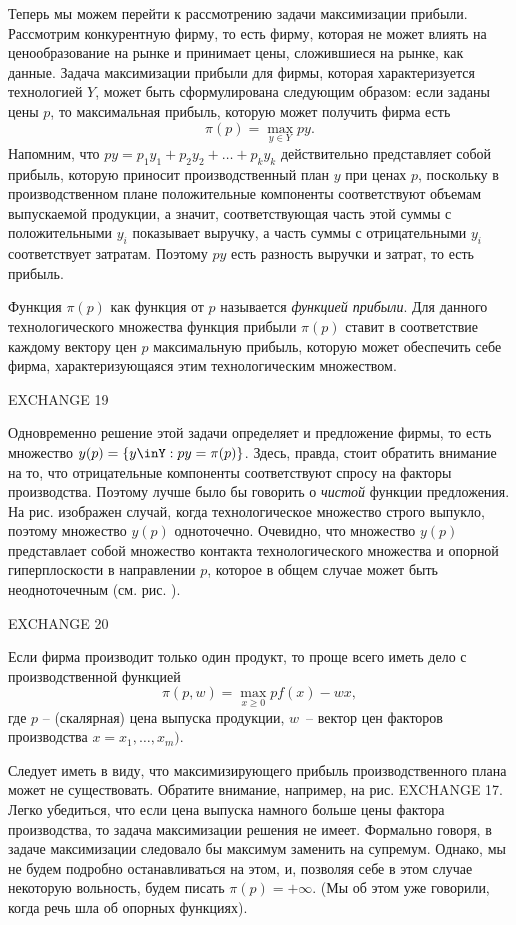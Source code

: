 Теперь мы можем перейти к рассмотрению задачи максимизации прибыли.
Рассмотрим конкурентную фирму, то есть
фирму, которая не может влиять на ценообразование на рынке и принимает
цены, сложившиеся на рынке, как данные. Задача максимизации прибыли
для фирмы, которая характеризуется технологией $Y$,
может быть сформулирована следующим образом: если заданы цены $p$, то
максимальная прибыль, которую может получить фирма есть
$$
\pi (p)=\max_{y\in Y} py.
$$
Напомним, что $py=p_1y_1+p_2y_2+\ldots+p_ky_k$ действительно представляет собой
прибыль, которую приносит производственный план $y$ при ценах
$p$, поскольку в производственном плане положительные компоненты соответствуют
объемам выпускаемой продукции, а значит, соответствующая часть этой суммы
с положительными $y_i$ показывает выручку, а часть суммы с отрицательными
$y_i$  соответствует затратам. Поэтому $py$ есть разность выручки и затрат,
то есть прибыль.

Функция $\pi (p)$ как функция от $p$ называется \emph{функцией прибыли}.
Для данного технологического множества функция прибыли $\pi (p)$ ставит
в соответствие каждому вектору цен $p$ максимальную прибыль, которую
может обеспечить себе фирма, характеризующаяся этим технологическим множеством.

EXCHANGE 19

Одновременно решение этой задачи определяет и предложение фирмы, то есть
множество $y(p)= \{y\inY: py=\pi(p)\}$. Здесь, правда, стоит обратить внимание на то,
что отрицательные компоненты соответствуют спросу на факторы производства. Поэтому
лучше было бы говорить о \emph{чистой} функции предложения.
На рис. изображен случай, когда технологическое множество строго выпукло,
поэтому множество $y(p)$ одноточечно. Очевидно, что множество $y(p)$
представлает собой множество контакта технологического множества и
опорной гиперплоскости в направлении $p$, которое в общем случае
может быть неодноточечным (см. рис.    ).

EXCHANGE 20

Если фирма производит только один продукт, то проще всего иметь дело с
производственной функцией
$$
\pi (p,w)=\max_{x\ge 0}pf(x)-wx,
$$
где $p$ -- (скалярная) цена выпуска продукции, $w$~-- вектор цен
факторов производства  $x=x_1,\ldots,x_m)$.


Следует иметь в виду, что максимизирующего прибыль производственного плана
может не существовать. Обратите внимание, например, на рис. EXCHANGE 17.
Легко убедиться, что если цена выпуска намного больше цены фактора производства,
то задача максимизации решения не имеет. Формально говоря, в задаче максимизации
следовало бы максимум заменить на супремум. Однако, мы не будем подробно
останавливаться на этом, и, позволяя себе в этом случае некоторую вольность,
будем писать $\pi(p)=+\infty$. (Мы об этом уже говорили, когда
речь шла об опорных функциях).


